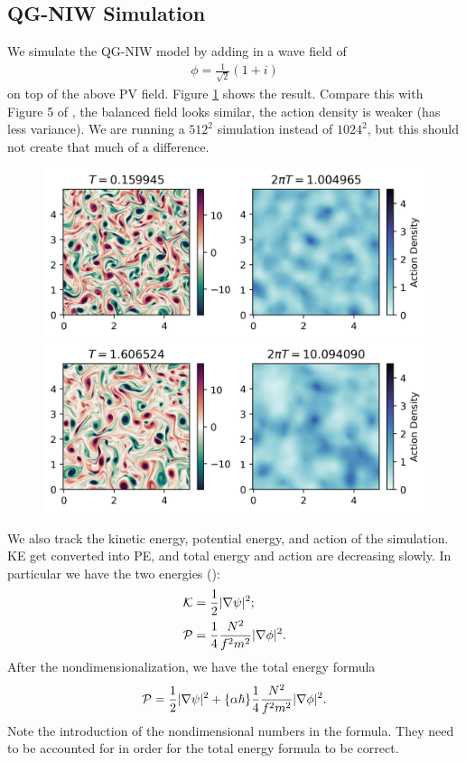 \subsection{QG-NIW Simulation}
We simulate the QG-NIW model by adding in a wave field of
\begin{align}
    \phi = \frac{1}{\sqrt{2}}(1+i)
\end{align}
on top of the above PV field. Figure \ref{fig:QGNIW_t1} shows the result. Compare this with Figure 5 of \cite{RochaEtAl_18}, the balanced field looks similar, the action density is weaker (has less variance). We are running a $512^2$ simulation instead of $1024^2$, but this should not create that much of a difference. 
\begin{figure}[H]
    \centering
    \includegraphics{QGNIW_t1}
    \includegraphics{QGNIW_t10}
    \caption{}
    \label{fig:QGNIW_t1}
\end{figure}

We also track the kinetic energy, potential energy, and action of the simulation. KE get converted into PE, and total energy and action are decreasing slowly. In particular we have the two energies (\cite[3.2]{RochaEtAl_18}):
\begin{align}
    &\mathcal{K} = \frac{1}{2}|\nabla\psi|^2;\\
    &\mathcal{P} = \frac{1}{4}\frac{N^2}{f^2m^2} |\nabla\phi|^2.
\end{align}
After the nondimensionalization, we have the total energy formula
\begin{align}
    \mathcal{P} = \frac{1}{2}|\nabla\psi|^2+\{\alpha\hbar\}\frac{1}{4}\frac{N^2}{f^2m^2} |\nabla\phi|^2.
\end{align}
Note the introduction of the nondimensional numbers in the formula. They need to be accounted for in order for the total energy formula to be correct. 

